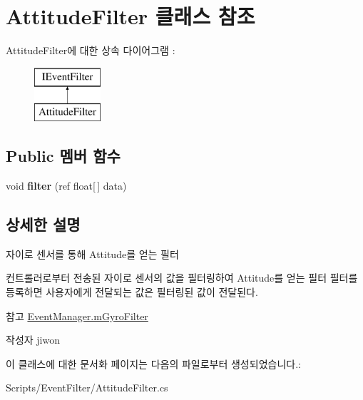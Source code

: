 \hypertarget{class_attitude_filter}{}\section{Attitude\+Filter 클래스 참조}
\label{class_attitude_filter}
Attitude\+Filter에 대한 상속 다이어그램 \+: \begin{figure}[H]
\begin{center}
\leavevmode
\includegraphics[height=2.000000cm]{class_attitude_filter}
\end{center}
\end{figure}
\subsection*{Public 멤버 함수}
\begin{DoxyCompactItemize}
\item 
\hypertarget{class_attitude_filter_a91c49319cb969aae2a5b28948eeac963}{}void {\bfseries filter} (ref float\mbox{[}$\,$\mbox{]} data)\label{class_attitude_filter_a91c49319cb969aae2a5b28948eeac963}

\end{DoxyCompactItemize}


\subsection{상세한 설명}
자이로 센서를 통해 Attitude를 얻는 필터

컨트롤러로부터 전송된 자이로 센서의 값을 필터링하여 Attitude를 얻는 필터 필터를 등록하면 사용자에게 전달되는 값은 필터링된 값이 전달된다. \begin{DoxySeeAlso}{참고}
\hyperlink{class_event_manager_a7cee85488f5d7220c102cd945b1f494a}{Event\+Manager.\+m\+Gyro\+Filter} 
\end{DoxySeeAlso}
\begin{DoxyAuthor}{작성자}
jiwon 
\end{DoxyAuthor}


이 클래스에 대한 문서화 페이지는 다음의 파일로부터 생성되었습니다.\+:\begin{DoxyCompactItemize}
\item 
Scripts/\+Event\+Filter/Attitude\+Filter.\+cs\end{DoxyCompactItemize}
